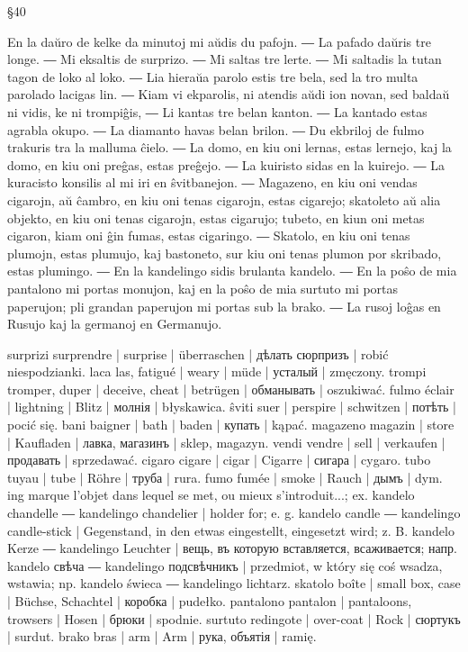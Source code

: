 §40

En la daŭro de kelke da minutoj mi aŭdis du pafojn. ― La pafado daŭris tre longe. ― Mi eksaltis de surprizo. ― Mi saltas tre lerte. ― Mi saltadis la tutan tagon de loko al loko. ― Lia hieraŭa parolo estis tre bela, sed la tro multa parolado lacigas lin. ― Kiam vi ekparolis, ni atendis aŭdi ion novan, sed baldaŭ ni vidis, ke ni trompiĝis, ― Li kantas tre belan kanton. ― La kantado estas agrabla okupo. ― La diamanto havas belan brilon. ― Du ekbriloj de fulmo trakuris tra la malluma ĉielo. ― La domo, en kiu oni lernas, estas lernejo, kaj la domo, en kiu oni preĝas, estas preĝejo. ― La kuiristo sidas en la kuirejo. ― La kuracisto konsilis al mi iri en ŝvitbanejon. ― Magazeno, en kiu oni vendas cigarojn, aŭ ĉambro, en kiu oni tenas cigarojn, estas cigarejo; skatoleto aŭ alia objekto, en kiu oni tenas cigarojn, estas cigarujo; tubeto, en kiun oni metas cigaron, kiam oni ĝin fumas, estas cigaringo. ― Skatolo, en kiu oni tenas plumojn, estas plumujo, kaj bastoneto, sur kiu oni tenas plumon por skribado, estas plumingo. ― En la kandelingo sidis brulanta kandelo. ― En la poŝo de mia pantalono mi portas monujon, kaj en la poŝo de mia surtuto mi portas paperujon; pli grandan paperujon mi portas sub la brako. ― La rusoj loĝas en Rusujo kaj la germanoj en Germanujo.

surprizi surprendre | surprise | überraschen | дѣлать сюрпризъ | robić niespodzianki.
laca las, fatigué | weary | müde | усталый | zmęczony.
trompi tromper, duper | deceive, cheat | betrügen | обманывать | oszukiwać.
fulmo éclair | lightning | Blitz | молнія | błyskawica.
ŝviti suer | perspire | schwitzen | потѣть | pocić się.
bani baigner | bath | baden | купать | kąpać.
magazeno magazin | store | Kaufladen | лавка, магазинъ | sklep, magazyn.
vendi vendre | sell | verkaufen | продавать | sprzedawać.
cigaro cigare | cigar | Cigarre | сигара | cygaro.
tubo tuyau | tube | Röhre | труба | rura.
fumo fumée | smoke | Rauch | дымъ | dym.
ing marque l’objet dans lequel se met, ou mieux s’introduit...; ex. kandelo chandelle ― kandelingo chandelier | holder for; e. g. kandelo candle ― kandelingo candle-stick | Gegenstand, in den etwas eingestellt, eingesetzt wird; z. B. kandelo Kerze ― kandelingo Leuchter | вещь, въ которую вставляется, всаживается; напр. kandelo свѣча ― kandelingo подсвѣчникъ | przedmiot, w który się coś wsadza, wstawia; np. kandelo świeca ― kandelingo lichtarz.
skatolo boîte | small box, case | Büchse, Schachtel | коробка | pudełko.
pantalono pantalon | pantaloons, trowsers | Hosen | брюки | spodnie.
surtuto redingote | over-coat | Rock | сюртукъ | surdut.
brako bras | arm | Arm | рука, объятія | ramię.

